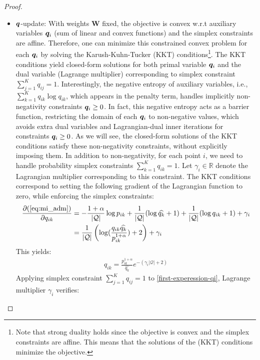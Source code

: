 \documentclass{article}
\begin{document}
\begin{proof}
\begin{itemize}
                \item $\bm{q}$-update: With weights $\mathbf W$ fixed, the objective is convex w.r.t auxiliary variables $\bm{q}_i$ (sum of linear and convex functions) and the simplex 
                    constraints are affine. Therefore, one can minimize this constrained convex problem for each $\bm{q}_i$ by solving the
                    Karush-Kuhn-Tucker (KKT) conditions\footnote{Note that strong duality holds since the objective is convex and the simplex constraints are affine. This
                    means that the solutions of the (KKT) conditions minimize the objective.}. The KKT conditions yield closed-form solutions for both
                    primal variable $\bm{q}_i$ and the dual variable (Lagrange multiplier) corresponding to simplex constraint $\sum_{j=1}^K q_{ij}=1$.
                    Interestingly, the negative entropy of auxiliary variables, i.e., $\sum_{k=1}^K q_{ik} \log q_{ik}$,  which appears in the penalty term, handles implicitly non-negativity constraints $\bm{q}_i \geq 0$. In fact, this negative entropy acts as a barrier function, restricting the domain of each $\bm{q}_i$ to non-negative values, which avoids extra dual variables and Lagrangian-dual inner iterations for constraints $\bm{q}_i \geq 0$. As we will see, the closed-form solutions of the KKT conditions satisfy these non-negativity constraints, without explicitly imposing them. In addition to non-negativity, for each point $i$, we need to handle probability simplex constraints $\sum_{k=1}^K q_{ik}=1$. Let $\gamma_i \in \mathbb{R}$ denote the Lagrangian multiplier corresponding to this constraint. The KKT conditions correspond to setting the following gradient of the Lagrangian function to zero, while enforcing the simplex constraints:   
\begin{align}
    		            \frac{\partial (\ref{eq:mi_adm})}{\partial q_{ik}} &= - \frac{1+\alpha}{|\mathcal{Q}|} \log p_{ik} + \frac{1}{|\mathcal{Q}|} (\log \widehat{q_k} + 1) + \frac{1}{|\mathcal{Q}|}(\log q_{ik} + 1) + \gamma_i \\
    		            &= \frac{1}{|\mathcal{Q}|} \left (\log (\frac{q_{ik} \widehat{q_k}}{p_{ik}^{1+\alpha}}) + 2 \right ) + \gamma_i
    		        \end{align}
This yields: 
    		        \begin{align}
    		        \label{first-experession-qi}
    		            q_{ik} = \frac{p_{ik}^{1+\alpha}}{\widehat{q_k}}e^{-(\gamma_i |\mathcal{Q}|+2)}
    		        \end{align}
    		        Applying simplex constraint $\sum_{j=1}^K q_{ij}=1$ to \eqref{first-experession-qi}, Lagrange multiplier $\gamma_i$ verifies:

\end{itemize}
\end{proof}
\end{document}
